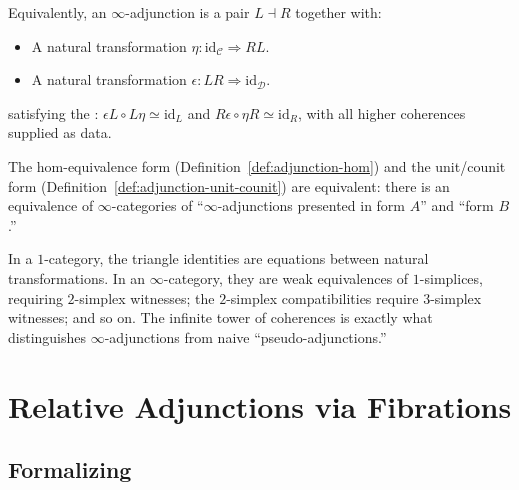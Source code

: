 \begin{definition}
\label{def:adjunction-unit-counit}
Equivalently, an $\infty$-adjunction is a pair $L \dashv R$ together with:
\begin{itemize}
  \item A  natural transformation $\eta : \mathrm{id}_\mathcal{C}
        \Rightarrow R L$.
  \item A  natural transformation $\epsilon : L R \Rightarrow
        \mathrm{id}_\mathcal{D}$.
\end{itemize}
satisfying the :
$\epsilon L \circ L \eta \simeq \mathrm{id}_L$ and $R \epsilon \circ
\eta R \simeq \mathrm{id}_R$, with all higher coherences supplied as
data.
\end{definition}

\begin{theorem}
\label{thm:adjunction-equiv}
The hom-equivalence form (Definition~\ref{def:adjunction-hom}) and the
unit/counit form (Definition~\ref{def:adjunction-unit-counit}) are
equivalent: there is an equivalence of $\infty$-categories of
``$\infty$-adjunctions presented in form $A$'' and ``form $B$.''
\end{theorem}

\begin{remark}
In a $1$-category, the triangle identities are equations between
natural transformations. In an $\infty$-category, they are weak
equivalences of $1$-simplices, requiring $2$-simplex witnesses; the
$2$-simplex compatibilities require $3$-simplex witnesses; and so on.
The infinite tower of coherences is exactly what distinguishes
$\infty$-adjunctions from naive ``pseudo-adjunctions.''
\end{remark}


\section{Relative Adjunctions via Fibrations}
\label{sec:relative-adjunctions}

\subsection{Formalizing}

